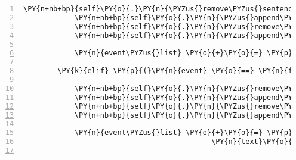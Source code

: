 \begin{Verbatim}[commandchars=\\\{\},numbers=left,firstnumber=1,stepnumber=1]
            \PY{n+nb+bp}{self}\PY{o}{.}\PY{n}{\PYZus{}remove\PYZus{}sentence}\PY{p}{(}\PY{n}{ID\PYZus{}CASSANDRA}\PY{p}{,} \PY{l+s}{\PYZsq{}}\PY{l+s}{Guten Tag, ich bin die Fee Cassandra.}\PY{l+s}{\PYZsq{}}\PY{p}{)}
            \PY{n+nb+bp}{self}\PY{o}{.}\PY{n}{\PYZus{}append\PYZus{}sentence}\PY{p}{(}\PY{n}{ID\PYZus{}CASSANDRA}\PY{p}{,} \PY{l+s}{\PYZsq{}}\PY{l+s}{Ich bin auf einer Reise, die mich durch den Zauberwald führt!}\PY{l+s}{\PYZsq{}}\PY{p}{)}
            \PY{n+nb+bp}{self}\PY{o}{.}\PY{n}{\PYZus{}remove\PYZus{}sentence}\PY{p}{(}\PY{n}{ID\PYZus{}KUNI}\PY{p}{,} \PY{l+s}{\PYZsq{}}\PY{l+s}{Wer bist du?}\PY{l+s}{\PYZsq{}}\PY{p}{)}
            \PY{n+nb+bp}{self}\PY{o}{.}\PY{n}{\PYZus{}append\PYZus{}sentence}\PY{p}{(}\PY{n}{ID\PYZus{}KUNI}\PY{p}{,} \PY{l+s}{\PYZsq{}}\PY{l+s}{Ich suche den Weg zum Zauberwald!}\PY{l+s}{\PYZsq{}}\PY{p}{)}

            \PY{n}{event\PYZus{}list} \PY{o}{+}\PY{o}{=} \PY{p}{[}\PY{n}{fabula}\PY{o}{.}\PY{n}{SaysEvent}\PY{p}{(}\PY{n}{identifier}\PY{o}{=}\PY{n}{ID\PYZus{}KUNI}\PY{p}{,} \PY{n}{text}\PY{o}{=}\PY{l+s}{\PYZsq{}}\PY{l+s}{Angenehm!}\PY{l+s}{\PYZsq{}}\PY{p}{)}\PY{p}{]}

        \PY{k}{elif} \PY{p}{(}\PY{n}{event} \PY{o}{==} \PY{n}{fabula}\PY{o}{.}\PY{n}{SaysEvent}\PY{p}{(}\PY{n}{identifier}\PY{o}{=}\PY{n}{ID\PYZus{}CASSANDRA}\PY{p}{,} \PY{n}{text}\PY{o}{=}\PY{l+s}{\PYZsq{}}\PY{l+s}{Mit wem habe ich die Ehre?}\PY{l+s}{\PYZsq{}}\PY{p}{)}\PY{p}{)}\PY{p}{:}

            \PY{n+nb+bp}{self}\PY{o}{.}\PY{n}{\PYZus{}remove\PYZus{}sentence}\PY{p}{(}\PY{n}{ID\PYZus{}CASSANDRA}\PY{p}{,} \PY{l+s}{\PYZsq{}}\PY{l+s}{Mit wem habe ich die Ehre?}\PY{l+s}{\PYZsq{}}\PY{p}{)}
            \PY{n+nb+bp}{self}\PY{o}{.}\PY{n}{\PYZus{}append\PYZus{}sentence}\PY{p}{(}\PY{n}{ID\PYZus{}CASSANDRA}\PY{p}{,} \PY{l+s}{\PYZsq{}}\PY{l+s}{Die Brücke, die über den Fluss in Richtung Zauberwald führt, ist kaputt.}\PY{l+s}{\PYZsq{}}\PY{p}{)}
            \PY{n+nb+bp}{self}\PY{o}{.}\PY{n}{\PYZus{}remove\PYZus{}sentence}\PY{p}{(}\PY{n}{ID\PYZus{}KUNI}\PY{p}{,} \PY{l+s}{\PYZsq{}}\PY{l+s}{Hallo, ich bin der Gnom Kuni.}\PY{l+s}{\PYZsq{}}\PY{p}{)}
            \PY{n+nb+bp}{self}\PY{o}{.}\PY{n}{\PYZus{}append\PYZus{}sentence}\PY{p}{(}\PY{n}{ID\PYZus{}KUNI}\PY{p}{,} \PY{l+s}{\PYZsq{}}\PY{l+s}{Es muss irgendwo einen Eingang zum alten Gnomenweg geben.}\PY{l+s}{\PYZsq{}}\PY{p}{)}

            \PY{n}{event\PYZus{}list} \PY{o}{+}\PY{o}{=} \PY{p}{[}\PY{n}{fabula}\PY{o}{.}\PY{n}{SaysEvent}\PY{p}{(}\PY{n}{identifier}\PY{o}{=}\PY{n}{ID\PYZus{}KUNI}\PY{p}{,}
                                            \PY{n}{text}\PY{o}{=}\PY{l+s}{\PYZsq{}}\PY{l+s}{Hallo, ich bin der Gnom Kuni.}\PY{l+s}{\PYZsq{}}\PY{p}{)}\PY{p}{]}


\end{Verbatim}
